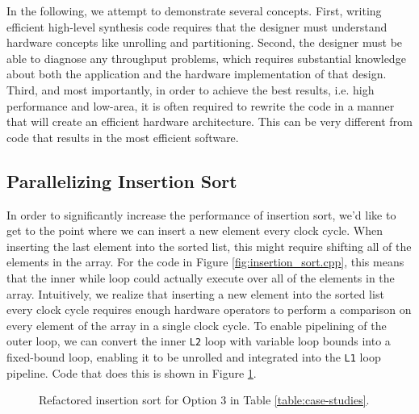 In the following, we attempt to demonstrate several concepts. First, writing efficient high-level synthesis code requires that the designer must understand hardware concepts like unrolling and partitioning. Second, the designer must be able to diagnose any throughput problems, which requires substantial knowledge about both the application and the hardware implementation of that design. Third, and most importantly, in order to achieve the best results, i.e. high performance and low-area, it is often required to rewrite the code in a manner that will create an efficient hardware architecture.  This can be very different from code that results in the most efficient software.

\subsection{Parallelizing Insertion Sort}

In order to significantly increase the performance of insertion sort, we'd like to get to the point where we can insert a new element every clock cycle.  When inserting the last element into the sorted list, this might require shifting all of the elements in the array.  For the code in Figure \ref{fig:insertion_sort.cpp}, this means that the inner while loop could actually execute over all of the elements in the array.  Intuitively, we realize that inserting a new element into the sorted list every clock cycle requires enough hardware operators to perform a comparison on every element of the array in a single clock cycle.  To enable pipelining of the outer loop, we can convert the inner \lstinline{L2} loop with variable loop bounds into a fixed-bound loop, enabling it to be unrolled and integrated into the \lstinline{L1} loop pipeline.  Code that does this is shown in Figure \ref{fig:insertion_sort_parallel.cpp}.

\begin{figure}
{\footnotesize }
\caption{Refactored insertion sort for Option 3 in Table \ref{table:case-studies}.}
\label{fig:insertion_sort_parallel.cpp}
\end{figure}

